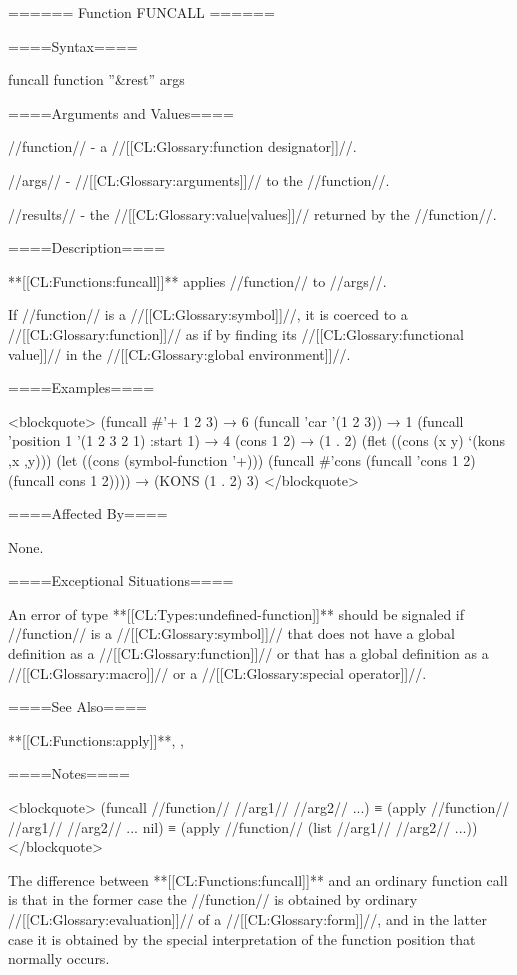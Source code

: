 ====== Function FUNCALL ======

====Syntax====

\DefunWithValues funcall {function ''&rest'' args} {}

====Arguments and Values====

//function// - a //[[CL:Glossary:function designator]]//.

//args// - //[[CL:Glossary:arguments]]// to the //function//.

//results// - the //[[CL:Glossary:value|values]]// returned by the //function//.

====Description====

**[[CL:Functions:funcall]]** applies //function// to //args//.

If //function// is a //[[CL:Glossary:symbol]]//, it is coerced to a //[[CL:Glossary:function]]// as if by finding its //[[CL:Glossary:functional value]]// in the //[[CL:Glossary:global environment]]//.

====Examples====

<blockquote> (funcall #'+ 1 2 3) → 6 (funcall 'car '(1 2 3)) → 1 (funcall 'position 1 '(1 2 3 2 1) :start 1) → 4 (cons 1 2) → (1 . 2) (flet ((cons (x y) `(kons ,x ,y))) (let ((cons (symbol-function '+))) (funcall #'cons (funcall 'cons 1 2) (funcall cons 1 2)))) → (KONS (1 . 2) 3) </blockquote>

====Affected By====

None.

====Exceptional Situations====

An error of type **[[CL:Types:undefined-function]]** should be signaled if //function// is a //[[CL:Glossary:symbol]]// that does not have a global definition as a //[[CL:Glossary:function]]// or that has a global definition as a //[[CL:Glossary:macro]]// or a //[[CL:Glossary:special operator]]//.

====See Also====

**[[CL:Functions:apply]]**, , {\secref\Evaluation}

====Notes====

<blockquote> (funcall //function// //arg1// //arg2// ...) ≡ (apply //function// //arg1// //arg2// ... nil) ≡ (apply //function// (list //arg1// //arg2// ...)) </blockquote>

The difference between **[[CL:Functions:funcall]]** and an ordinary function call is that in the former case the //function// is obtained by ordinary //[[CL:Glossary:evaluation]]// of a //[[CL:Glossary:form]]//, and in the latter case it is obtained by the special interpretation of the function position that normally occurs.

